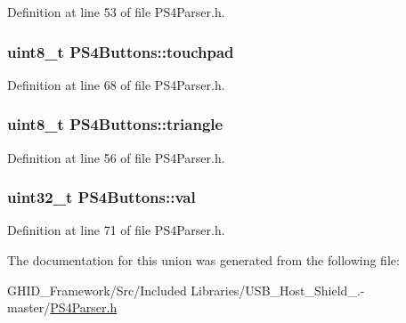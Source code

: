 \-Definition at line 53 of file \-P\-S4\-Parser.\-h.

\hypertarget{union_p_s4_buttons_a785305478e29a078003c360babb50ab0}{
\subsubsection[{touchpad}]{\setlength{\rightskip}{0pt plus 5cm}uint8\-\_\-t {\bf \-P\-S4\-Buttons\-::touchpad}}}\label{union_p_s4_buttons_a785305478e29a078003c360babb50ab0}


\-Definition at line 68 of file \-P\-S4\-Parser.\-h.

\hypertarget{union_p_s4_buttons_a72d07e9a47b1b75474e152b6aaeae6e5}{
\subsubsection[{triangle}]{\setlength{\rightskip}{0pt plus 5cm}uint8\-\_\-t {\bf \-P\-S4\-Buttons\-::triangle}}}\label{union_p_s4_buttons_a72d07e9a47b1b75474e152b6aaeae6e5}


\-Definition at line 56 of file \-P\-S4\-Parser.\-h.

\hypertarget{union_p_s4_buttons_aa381b471d6e5f1e36fa87048b0f8ddc9}{
\subsubsection[{val}]{\setlength{\rightskip}{0pt plus 5cm}uint32\-\_\-t {\bf \-P\-S4\-Buttons\-::val}}}\label{union_p_s4_buttons_aa381b471d6e5f1e36fa87048b0f8ddc9}


\-Definition at line 71 of file \-P\-S4\-Parser.\-h.



\-The documentation for this union was generated from the following file\-:\begin{DoxyCompactItemize}
\item 
\-G\-H\-I\-D\-\_\-\-Framework/\-Src/\-Included Libraries/\-U\-S\-B\-\_\-\-Host\-\_\-\-Shield\-\_.-\/master/\hyperlink{_p_s4_parser_8h}{\-P\-S4\-Parser.\-h}\end{DoxyCompactItemize}
